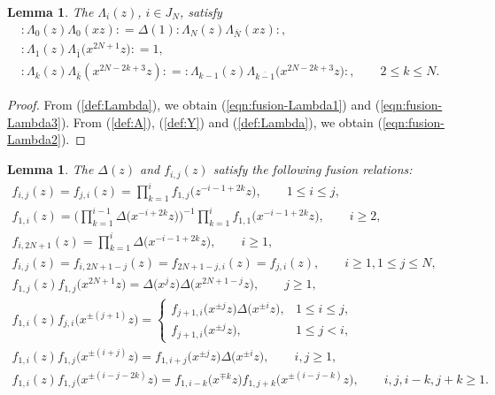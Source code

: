 \documentclass[10pt,a4paper]{amsart}
\numberwithin{equation}{section}
\newtheorem{Lemma}[Theorem]{Lemma}
\begin{document}
\begin{Lemma}
The $\Lambda_i(z)$, $i \in J_N$, satisfy
\begin{gather}
{:}\Lambda_0(z)\Lambda_0(xz){:}=\Delta(1){:}\Lambda_N(z)\Lambda_{\bar{N}}(xz){:},
\label{eqn:fusion-Lambda1}
\\
{:}\Lambda_1(z)\Lambda_{\bar{1}}\big(x^{2N+1}z\big){:}=1,
\label{eqn:fusion-Lambda2}
\\
{:}\Lambda_k(z)\Lambda_{\bar{k}}(x^{2N-2k+3}z){:}=
{:}\Lambda_{k-1}(z)\Lambda_{\overline{k-1}}\big(x^{2N-2k+3}z\big){:},\qquad
2\leq k \leq N.
\label{eqn:fusion-Lambda3}
\end{gather}
\end{Lemma}

\begin{proof}
From (\ref{def:Lambda}), we obtain (\ref{eqn:fusion-Lambda1}) and (\ref{eqn:fusion-Lambda3}).
From (\ref{def:A}), (\ref{def:Y}) and (\ref{def:Lambda}), we obtain (\ref{eqn:fusion-Lambda2}).
\end{proof}


\begin{Lemma}
The $\Delta(z)$ and $f_{i,j}(z)$ satisfy the following fusion relations:
\begin{gather}
f_{i,j}(z)=f_{j,i}(z)=\prod_{k=1}^i f_{1,j}\big(z^{-i-1+2k}z\big),\qquad
1\leq i \leq j,
\label{eqn:fusion-f1}
\\
f_{1,i}(z)=\Bigg(\prod_{k=1}^{i-1}\Delta\big(x^{-i+2k}z\big)\Bigg)^{-1}
\prod_{k=1}^i f_{1,1}\big(x^{-i-1+2k}z\big),\qquad
i \geq 2,
\label{eqn:fusion-f2}
\\
f_{i,2N+1}(z)=\prod_{k=1}^{i}\Delta\big(x^{-i-1+2k}z\big),\qquad i \geq 1,
\label{eqn:fusion-f3}
\\
f_{i, j}(z)=f_{i, 2N+1-j}(z)=
f_{2N+1-j, i}(z)=f_{j,i}(z),\qquad
i \geq 1, 1\leq j \leq N,
\label{eqn:fusion-f3(2)}
\\
f_{1,j}(z)f_{1,j}\big(x^{2N+1}z\big)=
\Delta\big(x^j z\big)\Delta\big(x^{2N+1-j}z\big),\qquad j \geq 1,
\label{eqn:fusion-f3(3)}
\\
f_{1,i}(z)f_{j,i}\big(x^{\pm (j+1)}z\big)=\begin{cases}
f_{j+1,i}\big(x^{\pm j}z\big)\Delta\big(x^{\pm i}z\big),& 1\leq i \leq j,
\\
f_{j+1,i}\big(x^{\pm j}z\big),& 1\leq j<i,
\end{cases}
\label{eqn:fusion-f4}
\\
f_{1,i}(z)f_{1,j}\big(x^{\pm (i+j)}z\big)=
f_{1,i+j}\big(x^{\pm j}z\big)\Delta\big(x^{\pm i}z\big),\qquad
i,j \geq 1,
\label{eqn:fusion-f5}
\\
f_{1,i}(z)f_{1,j}\big(x^{\pm (i-j-2k)}z\big)=
f_{1,i-k}\big(x^{\mp k}z\big)f_{1,j+k}\big(x^{\pm (i-j-k)}z\big),\qquad
i,j,i-k,j+k \geq 1.
\label{eqn:fusion-f6}
\end{gather}
\end{Lemma}
\end{document}
